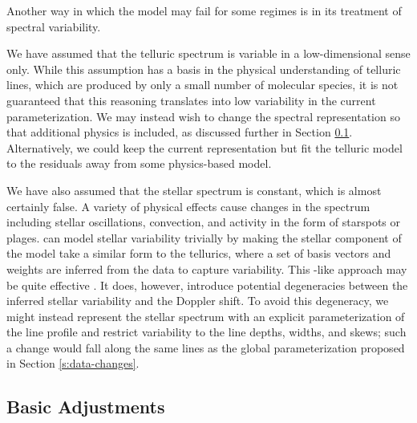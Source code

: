 \documentclass[modern]{aastex62}
\begin{document}
Another way in which the \wobble model may fail for some regimes is in its treatment of spectral variability.

We have assumed that the telluric spectrum is variable in a low-dimensional sense only.
While this assumption has a basis in the physical understanding of telluric lines, which are produced by only a small number of molecular species, it is not guaranteed that this reasoning translates into low variability in the current parameterization.
We may instead wish to change the spectral representation so that additional physics is included, as discussed further in Section \ref{s:improvements}.
Alternatively, we could keep the current representation but fit the telluric model to the residuals away from some physics-based model.

We have also assumed that the stellar spectrum is constant, which is almost certainly false.
A variety of physical effects cause changes in the spectrum including stellar oscillations, convection, and activity in the form of starspots or plages.
\wobble can model stellar variability trivially by making the stellar component of the model take a similar form to the tellurics, where a set of basis vectors and weights are inferred from the data to capture variability.
This \PCA-like approach may be quite effective \citep{Davis2017}.
It does, however, introduce potential degeneracies between the inferred stellar variability and the Doppler shift.
To avoid this degeneracy, we might instead represent the stellar spectrum with an explicit parameterization of the line profile and restrict variability to the line depths, widths, and skews; such a change would fall along the same lines as the global \LSF parameterization proposed in Section \ref{s:data-changes}.




\subsection{Basic Adjustments}
\label{s:improvements}
\end{document}
